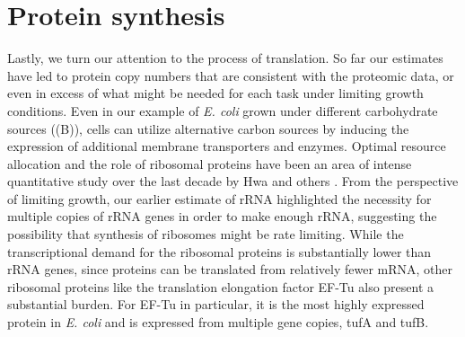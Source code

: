\section{Protein synthesis}

Lastly, we turn our attention to the process of translation. So far our
estimates have led to protein copy numbers that are consistent with the
proteomic data, or even in excess of what might be needed for each task under
limiting growth conditions. Even in our example of \textit{E. coli} grown under
different carbohydrate sources ((B)), cells can utilize
alternative carbon sources by inducing the expression of additional membrane
transporters and enzymes. Optimal resource allocation and the role of ribosomal
proteins have been an area of intense quantitative study over the last decade by
Hwa and others \citep{scott2010, hui2015}. From the perspective of limiting
growth, our earlier estimate of rRNA highlighted the necessity for multiple
copies of rRNA genes in order to make enough rRNA, suggesting the possibility
that synthesis of ribosomes might be rate limiting. While the transcriptional
demand for  the ribosomal proteins is substantially lower than rRNA genes, since
proteins can be translated from relatively fewer mRNA, other ribosomal
proteins like the translation elongation factor EF-Tu also present a substantial
burden. For EF-Tu  in particular, it is the most highly expressed protein in
\textit{E. coli} and is expressed from multiple gene copies, tufA and
tufB.




